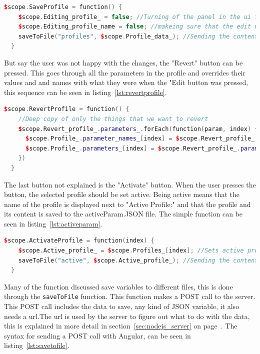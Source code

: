 \begin{lstlisting}[caption = {SaveProfile function in editParam.js}, captionpos=b, label={lst:saveprofile}, language=C++,firstnumber=1]
$scope.SaveProfile = function() {
    $scope.Editing_profile_ = false; //Turning of the panel in the ui for editing
    $scope.Editing_profile_name = false; //makeing sure that the edit name ui change is reset.
    saveToFile("profiles", $scope.Profile_data_); //Sending the content to the server to get saved.
  }
\end{lstlisting}

But say the user was not happy with the changes, the "Revert" button can be pressed. This goes through all the parameters in the profile and overrides their values and and names with what they were when the "Edit button was pressed, this sequence can be seen in listing~\ref{lst:revertprofile}.

\begin{lstlisting}[caption = {RevertProfile function in editParam.js}, captionpos=b, label={lst:revertprofile}, language=C++,firstnumber=1]
$scope.RevertProfile = function() {
    //Deep copy of only the things that we want to revert
    $scope.Revert_profile_.parameters_.forEach(function(param, index) {
      $scope.Profile_.parameter_names_[index] = $scope.Revert_profile_.parameter_names_[index];
      $scope.Profile_.parameters_[index] = $scope.Revert_profile_.parameters_[index];
    })
  }
\end{lstlisting}

The last button not explained is the "Activate" button. When the user presses the button, the selected profile should be set active. Being active means that the name of the profile is displayed next to "Active Profile:" and that the profile and its content is saved to the activeParam.JSON file. The simple function can be seen in listing~\ref{lst:activeparam}.

\begin{lstlisting}[caption = {ActivateProfile function in editParam.js}, captionpos=b, label={lst:activeparam}, language=C++,firstnumber=1]
$scope.ActivateProfile = function(index) {
    $scope.Active_profile_ = $scope.Profiles_[index]; //Sets active profile to be the profile at index in the list Profiles_
    saveToFile("active", $scope.Active_profile_); //Sending the content to the server to get saved.
  }
\end{lstlisting}

Many of the function discussed save variables to different files, this is done through the \texttt{saveToFile} function. This function makes a POST call to the server. This POST call includes the data to save, any kind of JSON variable, it also needs a url.The url is used by the server to figure out what to do with the data, this is explained in more detail in section~\ref{sec:nodejs_server}  on page~\pageref{sec:nodejs_server}. The syntax for sending a POST call with Angular, can be seen in listing~\ref{lst:savetofile}.

